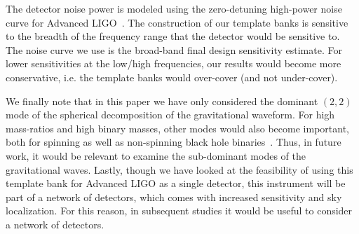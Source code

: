 The detector noise power is modeled using the zero-detuning high-power 
noise curve for Advanced LIGO~\cite{aLIGONoiseCurve}.
The construction of our template banks is sensitive to the breadth
of the frequency range that the detector would be 
sensitive to. The noise curve we use is the broad-band final design 
sensitivity estimate. For lower sensitivities
at the low/high frequencies, our results would become more conservative, 
i.e. the template banks would over-cover (and not under-cover).

We finally note that in this paper we have only considered the
dominant $(2,2)$ mode of the spherical decomposition of the 
gravitational waveform. For high mass-ratios and high binary masses,
other modes would also become important, both for spinning as well
as non-spinning black hole binaries~\cite{Pekowsky:2012sr,
Brown:2012nn,Capano:2013inPrep}.
Thus, in future work, it would be relevant to examine the
sub-dominant modes of the gravitational waves. Lastly, though we have
looked at the feasibility of using this template bank for Advanced
LIGO as a single detector, this instrument will be part of a network
of detectors, which comes with increased sensitivity and sky
localization. For this reason, in subsequent studies it would be
useful to consider a network of detectors.
